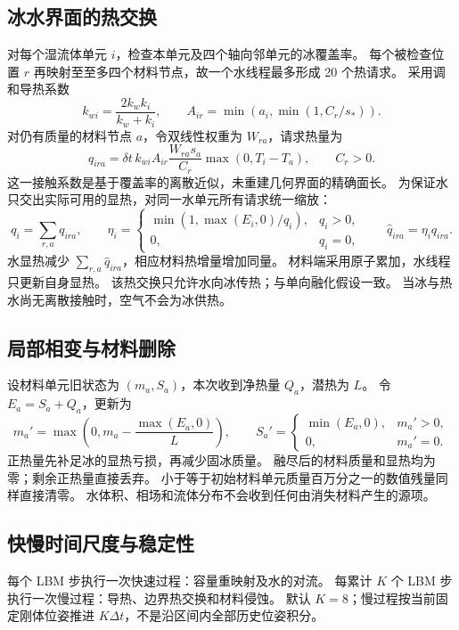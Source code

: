 \subsection{冰水界面的热交换}
对每个湿流体单元 $i$，检查本单元及四个轴向邻单元的冰覆盖率。
每个被检查位置 $r$ 再映射至至多四个材料节点，故一个水线程最多形成 20 个热请求。
采用调和导热系数
\begin{equation}
 k_{wi}=\frac{2k_wk_i}{k_w+k_i},\qquad
 A_{ir}=\min\left(a_i,\min(1,C_r/s_*)\right).
\end{equation}
对仍有质量的材料节点 $a$，令双线性权重为 $W_{ra}$，请求热量为
\begin{equation}
 q_{ira}=\delta t\,k_{wi}A_{ir}\frac{W_{ra}s_a}{C_r}
 \max(0,T_i-T_a),\qquad C_r>0.
\end{equation}
这一接触系数是基于覆盖率的离散近似，未重建几何界面的精确面长。
为保证水只交出实际可用的显热，对同一水单元所有请求统一缩放：
\begin{equation}
 q_i=\sum_{r,a}q_{ira},\qquad
 \eta_i=\begin{cases}\min(1,\max(E_i,0)/q_i),&q_i>0,\\0,&q_i=0,\end{cases}
 \qquad \widehat q_{ira}=\eta_iq_{ira}.
\end{equation}
水显热减少 $\sum_{r,a}\widehat q_{ira}$，相应材料热增量增加同量。
材料端采用原子累加，水线程只更新自身显热。
该热交换只允许水向冰传热；与单向融化假设一致。
当冰与热水尚无离散接触时，空气不会为冰供热。

\subsection{局部相变与材料删除}
设材料单元旧状态为 $(m_a,S_a)$，本次收到净热量 $Q_a$，潜热为 $L$。
令 $E_a=S_a+Q_a$，更新为
\begin{equation}
 m_a'=\max\left(0,m_a-\frac{\max(E_a,0)}{L}\right),\qquad
 S_a'=\begin{cases}\min(E_a,0),&m_a'>0,\\0,&m_a'=0.\end{cases}
\end{equation}
正热量先补足冰的显热亏损，再减少固冰质量。
融尽后的材料质量和显热均为零；剩余正热量直接丢弃。
小于等于初始材料单元质量百万分之一的数值残量同样直接清零。
水体积、相场和流体分布不会收到任何由消失材料产生的源项。


\subsection{快慢时间尺度与稳定性}
\label{sec:multirate}
每个 LBM 步执行一次快速过程：容量重映射及水的对流。
每累计 $K$ 个 LBM 步执行一次慢过程：导热、边界热交换和材料侵蚀。
默认 $K=8$；慢过程按当前固定刚体位姿推进 $K\Delta t$，不是沿区间内全部历史位姿积分。

